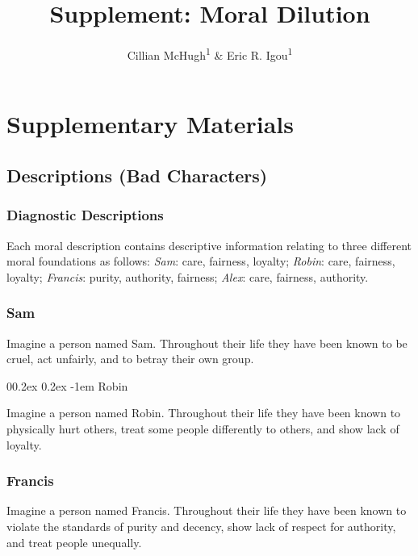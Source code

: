 \documentclass[
  man,floatsintext]{apa6}
\title{Supplement: Moral Dilution}
\author{Cillian McHugh\textsuperscript{1} \& Eric R. Igou\textsuperscript{1}}
\date{}
\affiliation{\vspace{0.5cm}\textsuperscript{1} University of Limerick}
\makeatletter
\let\oldparagraph\paragraph
\renewcommand{\paragraph}[1]{\oldparagraph{#1}\mbox{}}
\renewcommand{\paragraph}{\@startsection{paragraph}{4}{\parindent}%
  {0\baselineskip \@plus 0.2ex \@minus 0.2ex}%
  {-1em}%
  {\normalfont\normalsize\bfseries\itshape\typesectitle}}
\makeatother
\begin{document}
\maketitle

{
\setcounter{tocdepth}{1}
\tableofcontents
}
\pagebreak

\section{Supplementary Materials}\label{supplementary-materials}

\subsection{Descriptions (Bad Characters)}\label{descriptions-bad-characters}

\subsubsection{Diagnostic Descriptions}\label{diagnostic-descriptions}

Each moral description contains descriptive information relating to three different moral foundations as follows: \emph{Sam}: care, fairness, loyalty; \emph{Robin}: care, fairness, loyalty; \emph{Francis}: purity, authority, fairness; \emph{Alex}: care, fairness, authority.

\subsubsection{Sam}\label{sam}

Imagine a person named Sam.
Throughout their life they have been known to be cruel, act unfairly, and to betray their own group.

\paragraph{Robin}\label{robin}

Imagine a person named Robin.
Throughout their life they have been known to physically hurt others, treat some people differently to others, and show lack of loyalty.

\subsubsection{Francis}\label{francis}

Imagine a person named Francis.
Throughout their life they have been known to violate the standards of purity and decency, show lack of respect for authority, and treat people unequally.
\end{document}
